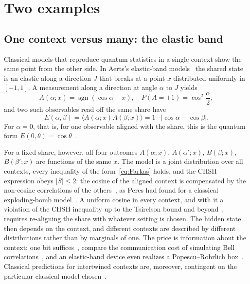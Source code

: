 \documentclass[aps,pra,reprint,superscriptaddress,longbibliography,nofootinbib]{revtex4-2}
\begin{document}
\section{Two examples}

\subsection{One context versus many: the elastic band}
\label{sec:band}

Classical models that reproduce quantum statistics in a single context show the same point from the other side.
In Aerts's elastic-band models~\cite{aerts:82,aerts-69,Aerts-91,Aerts_2014,Aerts_2016} the shared state is an elastic along a direction $J$ that breaks at a point $x$ distributed uniformly in $[-1,1]$.
A measurement along a direction at angle $\alpha$ to $J$ yields
\begin{equation}
A(\alpha;x)=\operatorname{sgn}(\cos\alpha-x),
\quad
P(A=+1)=\cos^2\frac{\alpha}{2},
\end{equation}
and two such observables read off the same share have
\begin{equation}
E(\alpha,\beta)=\langle A(\alpha;x)A(\beta;x)\rangle = 1-\vert\cos\alpha-\cos\beta\vert .
\end{equation}
For $\alpha=0$, that is, for one observable aligned with the share, this is the quantum form $E(0,\theta)=\cos\theta$~\cite{svozil-2022-epr}.

For a fixed share, however, all four outcomes $A(\alpha;x)$, $A(\alpha';x)$, $B(\beta;x)$, $B(\beta';x)$ are functions of the same $x$.
The model is a joint distribution over all contexts, every inequality of the form~\eqref{eq:Farkas} holds, and the CHSH expression obeys $\vert S\vert\le 2$: the cosine of the aligned context is compensated by the non-cosine correlations of the others~\cite{svozil-2022-epr}, as Peres had found for a classical exploding-bomb model~\cite{peres222}.
A uniform cosine in every context, and with it a violation of the CHSH inequality up to the Tsirelson bound and beyond~\cite{svozil-krenn,svozil-2022-epr}, requires re-aligning the share with whatever setting is chosen.
The hidden state then depends on the context, and different contexts are described by different distributions rather than by marginals of one.
The price is information about the context: one bit suffices~\cite{svozil-2022-epr}, compare the communication cost of simulating Bell correlations~\cite{toner-bacon-03,svozil-2004-brainteaser}, and an elastic-band device even realizes a Popescu--Rohrlich box~\cite{AertsSven,cerf-gisin-massar-pop-04,pop-rohr}.
Classical predictions for intertwined contexts are, moreover, contingent on the particular classical model chosen~\cite{svozil-2020-c}.
\end{document}
